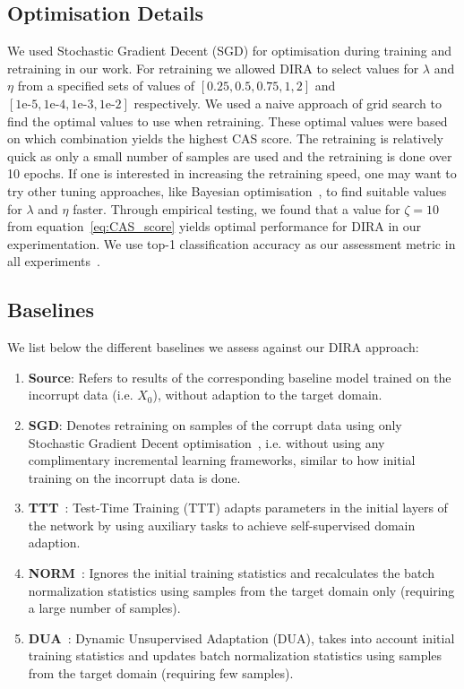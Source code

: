%

\subsection{Optimisation Details}
We used Stochastic Gradient Decent (SGD) for optimisation during training and retraining in our work.
%
For retraining we allowed DIRA to select values for $\lambda$ and $\eta$ from a specified sets of values of $[0.25, 0.5, 0.75, 1, 2]$ and $[1\text{e-}5,1\text{e-}4,1\text{e-}3,1\text{e-}2]$ respectively. 
%
We used a naive approach of grid search to find the optimal values to use when retraining. 
%
These optimal values were based on which combination yields the highest CAS score.
%
The retraining is relatively quick as only a small number of samples are used and the retraining is done over 10 epochs.
%
If one is interested in increasing the retraining speed, one may want to try other tuning approaches, like Bayesian optimisation~\cite{Mockus1975,Snoek2012,Feurer2019}, to find suitable values for $\lambda$ and $\eta$ faster.
%
Through empirical testing, we found that a value for $\zeta=10$ from equation~\ref{eq:CAS_score} yields optimal performance for DIRA in our experimentation. 
%
We use top-1 classification accuracy as our assessment metric in all experiments~\cite{ghobrial2023evaluation}.


\subsection{Baselines}
We list below the different baselines we assess against our DIRA approach:
\begin{enumerate}
    \item \textbf{Source}: Refers to results of the corresponding baseline model trained on the incorrupt data (i.e. $X_0$), without adaption to the target domain.

    \item \textbf{SGD}: Denotes retraining on samples of the corrupt data using only Stochastic Gradient Decent optimisation~\cite{GoodBengCour2016}, i.e. without using any complimentary incremental learning frameworks, similar to how initial training on the incorrupt data is done.

    \item \textbf{TTT}~\cite{sun2020test}: Test-Time Training (TTT) adapts parameters in the initial layers of the network by using auxiliary tasks to achieve self-supervised domain adaption. 
    
    \item \textbf{NORM}~\cite{schneider2020improving, nado2020evaluating}: Ignores the initial training statistics and recalculates the batch normalization statistics using samples from the target domain only (requiring a large number of samples).

    \item \textbf{DUA}~\cite{mirza2022norm}: Dynamic Unsupervised Adaptation (DUA), takes into account initial training statistics and updates batch normalization statistics using samples from the target domain (requiring few samples).
    
\end{enumerate}


